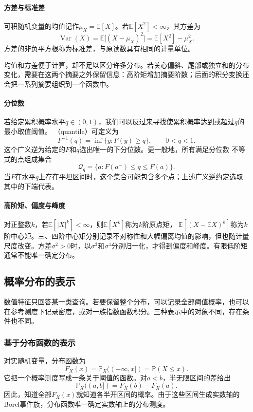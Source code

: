 \paragraph{方差与标准差}
可积随机变量的均值记作\(\mu_X=\mathbb{E}[X]\)。若\(\mathbb{E}[X^2]<\infty\)，其方差为
\[ \operatorname{Var}(X)
  =\mathbb{E}\bigl[(X-\mu_X)^2\bigr]=\mathbb{E}[X^2]-\mu_X^2. \]
方差的非负平方根称为标准差，与原读数具有相同的计量单位。

均值和方差便于计算，却不足以区分许多分布。若关心偏斜、尾部或独立和的分布变化，需要在这两个摘要之外保留信息：高阶矩增加摘要阶数；后面的积分变换还会把一系列摘要组织到一个函数中。

\paragraph{分位数}
若给定累积概率水平\(q\in(0,1)\)，我们可以反过来寻找使累积概率达到或超过\(q\)的最小取值阈值。
（quantile）可定义为
\[
  F^{-1}(q)=\inf\{y:F(y)\geq q\},\qquad 0<q<1.
\]
这个广义逆为给定的\(F\)和\(q\)选出唯一的下分位数。更一般地，所有满足分位数
不等式的点组成集合
\[
  \mathcal Q_q=\{a:F(a^-)\leq q\leq F(a)\}.
\]
当\(F\)在水平\(q\)上存在平坦区间时，这个集合可能包含多个点；上述广义逆约定选取其中的下端代表。

\paragraph{高阶矩、偏度与峰度}
对正整数\(k\)，若\(\mathbb{E}[|X|^k]<\infty\)，则\(\mathbb{E}[X^k]\)称为\(k\)阶原点矩，
\(\mathbb{E}[(X-\mathbb{E}X)^k]\)称为\(k\)阶中心矩。三、四阶中心矩分别记录不对称性和大幅偏离均值的影响，但也随计量尺度改变。方差\(\sigma^2>0\)时，以\(\sigma^3\)和\(\sigma^4\)分别归一化，才得到偏度和峰度。有限低阶矩通常不能唯一确定分布。

\subsection{概率分布的表示}
\label{sec:rv-distribution}
数值特征只回答某一类查询。若要保留整个分布，可以记录全部阈值概率，也可以在参考测度下记录密度，或对一族指数函数积分。三种表示中的对象不同，存在条件也不同。

\subsubsection{基于分布函数的表示}
对实随机变量，分布函数为
\[ F_X(x)=\mathbb P_X(({-\infty},x])=\mathbb P(X\leq x). \]
它把一个概率测度写成一条关于阈值的函数。对\(a<b\)，半无限区间的差给出
\[ \mathbb P_X((a,b])=F_X(b)-F_X(a). \]
因此，知道全部\(F_X(x)\)就知道各半开区间的概率。由于这些区间生成实数轴的Borel事件族，分布函数唯一确定实数轴上的分布测度。

